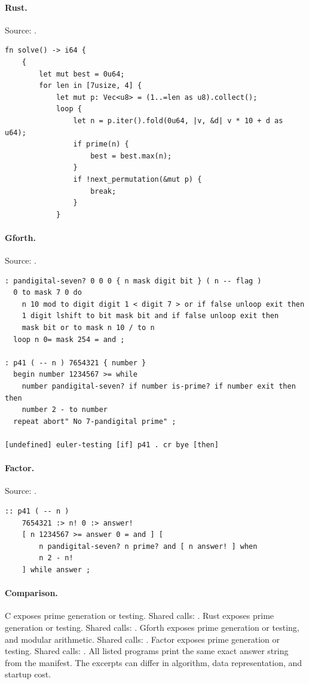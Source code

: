 \paragraph{Rust.} Source: .
\begin{lstlisting}
fn solve() -> i64 {
    {
        let mut best = 0u64;
        for len in [7usize, 4] {
            let mut p: Vec<u8> = (1..=len as u8).collect();
            loop {
                let n = p.iter().fold(0u64, |v, &d| v * 10 + d as u64);
                if prime(n) {
                    best = best.max(n);
                }
                if !next_permutation(&mut p) {
                    break;
                }
            }
\end{lstlisting}

\paragraph{Gforth.} Source: .
\begin{lstlisting}
: pandigital-seven? 0 0 0 { n mask digit bit } ( n -- flag )
  0 to mask 7 0 do
    n 10 mod to digit digit 1 < digit 7 > or if false unloop exit then
    1 digit lshift to bit mask bit and if false unloop exit then
    mask bit or to mask n 10 / to n
  loop n 0= mask 254 = and ;

: p41 ( -- n ) 7654321 { number }
  begin number 1234567 >= while
    number pandigital-seven? if number is-prime? if number exit then then
    number 2 - to number
  repeat abort" No 7-pandigital prime" ;

[undefined] euler-testing [if] p41 . cr bye [then]
\end{lstlisting}

\paragraph{Factor.} Source: .
\begin{lstlisting}
:: p41 ( -- n )
    7654321 :> n! 0 :> answer!
    [ n 1234567 >= answer 0 = and ] [
        n pandigital-seven? n prime? and [ n answer! ] when
        n 2 - n!
    ] while answer ;
\end{lstlisting}

\paragraph{Comparison.}
C exposes prime generation or testing. Shared calls: \texttt{}. Rust exposes prime generation or testing. Shared calls: \texttt{}. Gforth exposes prime generation or testing, and modular arithmetic. Shared calls: \texttt{}. Factor exposes prime generation or testing. Shared calls: \texttt{}.
All listed programs print the same exact answer string from the manifest. The excerpts can differ in algorithm, data representation, and startup cost.

